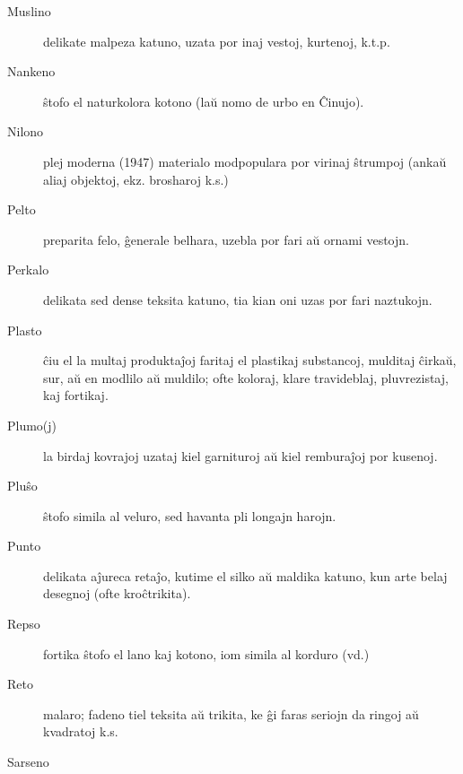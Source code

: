 \begin{description}
\item[Muslino]

 delikate malpeza katuno, uzata por inaj vestoj, kurtenoj, k.t.p.

\item[Nankeno]

 ŝtofo el naturkolora kotono (laŭ nomo de urbo en Ĉinujo).

\item[\ast\space Nilono]

 plej moderna (1947) materialo modpopulara por virinaj ŝtrumpoj (ankaŭ aliaj objektoj, ekz. brosharoj k.s.)

\item[Pelto]

 preparita felo, ĝenerale belhara, uzebla por fari aŭ ornami vestojn.

\item[Perkalo]

 delikata sed dense teksita katuno, tia kian oni uzas por fari naztukojn.

\item[\ast\space Plasto]

 ĉiu el la multaj produktaĵoj faritaj el plastikaj substancoj, mulditaj ĉirkaŭ, sur, aŭ en modlilo aŭ muldilo; ofte koloraj, klare travideblaj, pluvrezistaj, kaj fortikaj.

\item[Plumo(j)]

 la birdaj kovrajoj uzataj kiel garnituroj aŭ kiel remburaĵoj por kusenoj.

\item[Pluŝo]

 ŝtofo simila al veluro, sed havanta pli longajn harojn.

\item[Punto]

 delikata aĵureca retaĵo, kutime el silko aŭ maldika katuno, kun arte belaj desegnoj (ofte kroĉtrikita).

\item[Repso]

 fortika ŝtofo el lano kaj kotono, iom simila al korduro (vd.)

\item[Reto]

 malaro; fadeno tiel teksita aŭ trikita, ke ĝi faras seriojn da ringoj aŭ kvadratoj k.s.

\item[\dagger\space Sarseno]


\end{description}
